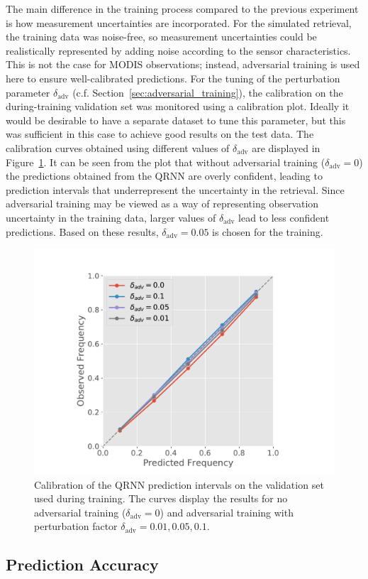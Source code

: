 \documentclass[journal abbreviation, manuscript]{copernicus}
\begin{document}
The main difference in the training process compared to the previous experiment
is how measurement uncertainties are incorporated. For the simulated retrieval,
the training data was noise-free, so measurement uncertainties could be
realistically represented by adding noise according to the sensor
characteristics. This is not the case for MODIS observations; instead,
adversarial training is used here to ensure well-calibrated predictions. For the
tuning of the perturbation parameter $\delta_{\text{adv}}$ (c.f.
Section~\ref{sec:adversarial_training}), the calibration on the during-training
validation set was monitored using a calibration plot. Ideally it would be
desirable to have a separate dataset to tune this parameter, but this was
sufficient in this case to achieve good results on the test data. The calibration curves
obtained using different values of $\delta_\text{adv}$ are displayed in
Figure~\ref{fig:validation_calibration}. It can be seen from the plot that
without adversarial training ($\delta_\text{adv} = 0$) the predictions obtained
from the QRNN are overly confident, leading to prediction intervals that
underrepresent the uncertainty in the retrieval. Since adversarial training may
be viewed as a way of representing observation uncertainty in the training data,
larger values of $\delta_\text{adv}$ lead to less confident predictions. Based
on these results, $\delta_\text{adv} = 0.05$ is chosen for the training.

  \begin{figure}[hbpt!]
    \centering
    \includegraphics[width = 0.4\linewidth]{../plots/validation_calibration}
    \caption{Calibration of the QRNN prediction intervals on the validation set
      used during training. The curves display the results for no adversarial training
      ($\delta_\text{adv} = 0$) and adversarial training with perturbation
      factor $\delta_\text{adv} = 0.01, 0.05, 0.1$.}
    \label{fig:validation_calibration}
  \end{figure}


\subsection{Prediction Accuracy}
\end{document}
